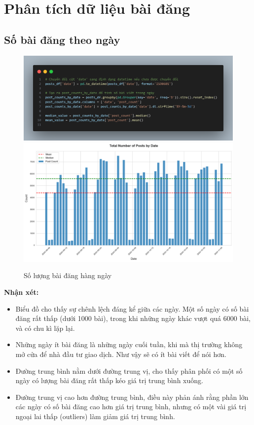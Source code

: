 \section{Phân tích dữ liệu bài đăng}

\subsection{Số bài đăng theo ngày}
\begin{figure}[H]
    \centering
    \includegraphics[width=0.75\linewidth]{images/code-2.14.png}
    \includegraphics[width=1\linewidth]{images/plot-2.21-column_chart.png}
    \caption{Số lượng bài đăng hàng ngày}
    \label{fig:2.1}
\end{figure}

\textbf{Nhận xét:}
\begin{itemize}
    \item Biểu đồ cho thấy sự chênh lệch đáng kể giữa các ngày. Một số ngày có số bài đăng rất thấp (dưới 1000 bài), trong khi những ngày khác vượt quá 6000 bài, và có chu kì lặp lại.
    \item Những ngày ít bài đăng là những ngày cuối tuần, khi mà thị trường không mở cửa để nhà đầu tư giao dịch. Như vậy sẽ có ít bài viết để nói hơn.
    \item Đường trung bình nằm dưới đường trung vị, cho thấy phân phối có một số ngày có lượng bài đăng rất thấp kéo giá trị trung bình xuống.
    \item Đường trung vị cao hơn đường trung bình, điều này phản ánh rằng phần lớn các ngày có số bài đăng cao hơn giá trị trung bình, nhưng có một vài giá trị ngoại lai thấp (outliers) làm giảm giá trị trung bình.
\end{itemize}

